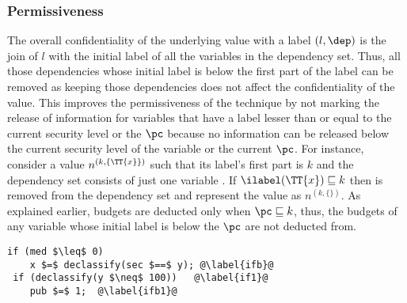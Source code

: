 
\subsubsection{Permissiveness}
The overall confidentiality of the underlying value with a
label $(l, \dep)$ is the join of $l$ with the initial label of all the
variables in the dependency set. Thus, all those dependencies whose
initial label is below the first part of the label can be removed as
keeping those dependencies does not affect the confidentiality of the
value.  This improves the permissiveness of the technique by not
marking the release of information for variables that have a label
lesser than or equal to the current security level or the $\pc$
because no information can be released below the current security
level of the variable or the current $\pc$. For instance, consider a
value $n^{(k, \{\TT{x}\})}$ such that its label's first part is $k$ and the
dependency set consists of just one variable . If
$\ilabel(\TT{x}) \sqsubseteq k$ then  is removed from the
dependency set and represent the value as $n^{(k, \{\})}$. As
explained earlier, budgets are deducted only when $\pc \sqsubseteq k$, 
thus, the budgets of any variable whose initial label
is below the $\pc$ are not deducted from. 


\begin{lstlisting}[float,caption=Example to illustrate permissiveness,label=egp]
 if (med $\leq$ 0) 
    x $=$ declassify(sec $==$ y); @\label{ifb}@
 if (declassify(y $\neq$ 100))   @\label{if1}@
    pub $=$ 1;  @\label{ifb1}@
\end{lstlisting}

